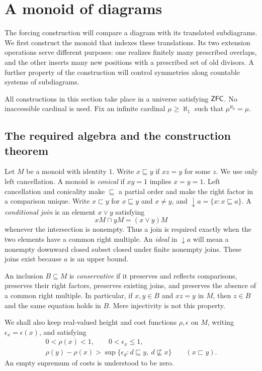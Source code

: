 \section{A monoid of diagrams}\label{sec:monoid}

The forcing construction will compare a diagram with its translated
subdiagrams.  We first construct the monoid that indexes these
translations.  Its two extension operations serve different purposes:
one realizes finitely many prescribed overlaps, and the other inserts
many new positions with a prescribed set of old divisors.  A further
property of the construction will control symmetries along countable
systems of subdiagrams.

All constructions in this section take place in a universe satisfying
$\mathsf{ZFC}$.  No inaccessible cardinal is used.  Fix an infinite cardinal
$\mu\geq\aleph_1$ such that $\mu^{\aleph_0}=\mu$.

\subsection{The required algebra and the construction theorem}

Let $M$ be a monoid with identity $1$. Write $x\sqsubseteq y$ if $xz=y$ for
some $z$.  We use only left cancellation.  A monoid is \emph{conical}
if $xy=1$ implies $x=y=1$.  Left cancellation and conicality make
$\sqsubseteq$ a partial order and make the right factor in a comparison
unique.  Write $x\sqsubset y$ for $x\sqsubseteq y$ and $x\ne y$,
and $\downarrow a=\{x:x\sqsubseteq a\}$.
A \emph{conditional join} is an element $x\vee y$ satisfying
\[
 xM\cap yM=(x\vee y)M
\]
whenever the intersection is nonempty.  Thus a join is required exactly
when the two elements have a common right multiple.
An \emph{ideal} in $\downarrow a$ will mean a nonempty downward closed
subset closed under finite nonempty joins.  These joins exist because
$a$ is an upper bound.

An inclusion $B\subseteq M$ is \emph{conservative} if it preserves and
reflects comparisons, preserves their right factors, preserves existing
joins, and preserves the absence of a common right multiple.  In
particular, if $x,y\in B$ and $xz=y$ in $M$, then $z\in B$ and the
same equation holds in $B$.  Mere injectivity is not this property.

We shall also keep real-valued height and cost functions $\rho,\epsilon$
on $M$, writing $\epsilon_x=\epsilon(x)$, and satisfying
\begin{equation}\label{eq:mono-margin}
 \begin{gathered}
 0<\rho(x)<1,\qquad 0<\epsilon_x\leq1,\\
 \rho(y)-\rho(x)>
 \sup\{\epsilon_d:d\sqsubseteq y,\ d\not\sqsubseteq x\}
 \qquad(x\sqsubset y).
 \end{gathered}
\end{equation}
An empty supremum of costs is understood to be zero.

